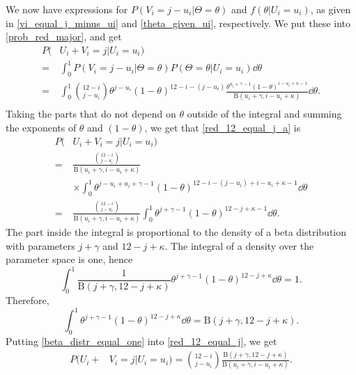 We now have expressions for $P(V_i=j-u_i|\Theta=\theta)$ and $f(\theta|U_i=u_i)$, as given in \eqref{vi_equal_j_minus_ui} and \eqref{theta_given_ui}, respectively. We put these into \eqref{prob_red_major}, and get
\begin{equation}
\label{red_12_equal_j_a}
    \begin{aligned}
         P(&U_i+V_i = j | U_i=u_i) \\[6pt]
        =& \int_0^1 P(V_i = j-u_i | \Theta=\theta) P(\Theta=\theta| U_i=u_i) \dd \theta \\[6pt]
        =& \int_0^1 \binom{12-i}{j-u_i}\theta^{j-u_i}(1-\theta)^{12-i-(j-u_i)} \frac{\theta^{u_i+\gamma-1}(1-\theta)^{i-u_i+\kappa-1}}{\text{B}(u_i+\gamma,i-u_i+\kappa)} \dd \theta.\\[6pt]
    \end{aligned}
\end{equation}
Taking the parts that do not depend on $\theta$ outside of the integral and summing the exponents of $\theta$ and $(1-\theta)$, we get that \eqref{red_12_equal_j_a} is
\begin{equation}
\label{red_12_equal_j}
    \begin{aligned}
         P(&U_i+V_i = j | U_i=u_i) \\[6pt]
        =& \frac{\binom{12-i}{j-u_i}}{\text{B}(u_i+\gamma,i-u_i+\kappa)} \\[6pt]
        &\times \int_0^1 
        \theta^{j-u_i+u_i+\gamma-1}(1-\theta)^{12-i-(j-u_i)+i-u_i+\kappa-1} \dd \theta\\[6pt]
        =& \frac{\binom{12-i}{j-u_i}}{\text{B}(u_i+\gamma,i-u_i+\kappa)} \int_0^1 
        \theta^{j+\gamma-1}(1-\theta)^{12-j+\kappa-1} \dd \theta.
    \end{aligned}
\end{equation}
The part inside the integral is proportional to the density of a beta distribution with parameters $j+\gamma$ and $12-j+\kappa$. The integral of a density over the parameter space is one, hence
\begin{equation*}
    \int_0^1 \frac{1}{\text{B}(j+\gamma,12-j+\kappa)}\theta^{j+\gamma-1}(1-\theta)^{12-j+\kappa} \dd \theta = 1.
\end{equation*}
Therefore,
\begin{equation}
\label{beta_distr_equal_one}
    \int_0^1 \theta^{j+\gamma-1}(1-\theta)^{12-j+\kappa} \dd \theta = \text{B}(j+\gamma,12-j+\kappa).
\end{equation}
Putting \eqref{beta_distr_equal_one} into \eqref{red_12_equal_j}, we get
\begin{equation}
\label{red_12_equal_j_final}
    \begin{aligned}
        P(U_i+&V_i = j | U_i=u_i) = \binom{12-i}{j-u_i} \frac{\text{B}(j+\gamma,12-j+\kappa)}{\text{B}(u_i+\gamma,i-u_i+\kappa)}.
    \end{aligned}
\end{equation}

